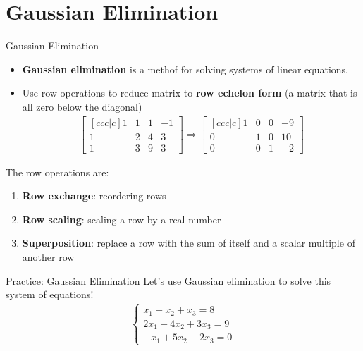 \section{Gaussian Elimination}

\begin{frame}{Gaussian Elimination}
    \begin{itemize}
        \item \textbf{Gaussian elimination} is a methof for solving systems of linear equations.
        \item Use row operations to reduce matrix to \textbf{row echelon form} (a matrix that is all zero below the diagonal)
        \begin{align*}
            \begin{bmatrix}[c c c | c]
                1 & 1 & 1 & -1 \\
                1 & 2 & 4 & 3 \\
                1 & 3 & 9 & 3
            \end{bmatrix} \Longrightarrow 
            \begin{bmatrix}[c c c | c]
                1 & 0 & 0 & -9 \\
                0 & 1 & 0 & 10 \\
                0 & 0 & 1 & -2
            \end{bmatrix}
        \end{align*}
    \end{itemize}
    The row operations are:
    \begin{enumerate}
        \item \textbf{Row exchange}: reordering rows
        \item \textbf{Row scaling}: scaling a row by a real number 
        \item \textbf{Superposition}: replace a row with the sum of itself and a scalar multiple of another row
    \end{enumerate}
\end{frame}


\begin{frame}{Practice: Gaussian Elimination}
    Let's use Gaussian elimination to solve this system of equations!
    \begin{align*}
        \begin{cases}
            x_1 + x_2 + x_3 = 8 \\
            2x_1 - 4x_2 + 3x_3 = 9 \\
            -x_1 + 5x_2 - 2x_3 = 0
        \end{cases}
    \end{align*}
\end{frame}

